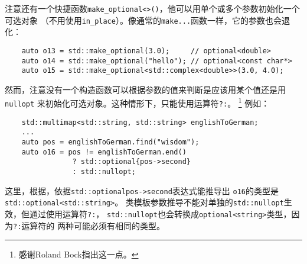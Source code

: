 注意还有一个快捷函数\texttt{make\_optional<>()}，他可以用单个或多个参数初始化一个可选对象
（不用使用\texttt{in\_place}）。像通常的\texttt{make...}函数一样，它的参数也会退化：
\begin{lstlisting}
    auto o13 = std::make_optional(3.0);     // optional<double>
    auto o14 = std::make_optional("hello"); // optional<const char*>
    auto o15 = std::make_optional<std::complex<double>>(3.0, 4.0);
\end{lstlisting}
然而，注意没有一个构造函数可以根据参数的值来判断是应该用某个值还是用\texttt{nullopt}
来初始化可选对象。这种情形下，只能使用运算符\texttt{?:}。
\footnote{感谢Roland Bock指出这一点。}
例如：
\begin{lstlisting}
    std::multimap<std::string, std::string> englishToGerman;
    ...
    auto pos = englishToGerman.find("wisdom");
    auto o16 = pos != englishToGerman.end()
                ? std::optional{pos->second}
                : std::nullopt;
\end{lstlisting}
这里，根据，依据\texttt{std::optional{pos->second}}表达式能推导出
\texttt{o16}的类型是\texttt{std::optional<std::string>}。
类模板参数推导不能对单独的\texttt{std::nullopt}生效，但通过使用运算符\texttt{?:}，
\texttt{std::nullopt}也会转换成\texttt{optional<string>}类型，因为\texttt{?:}运算符的
两种可能必须有相同的类型。

